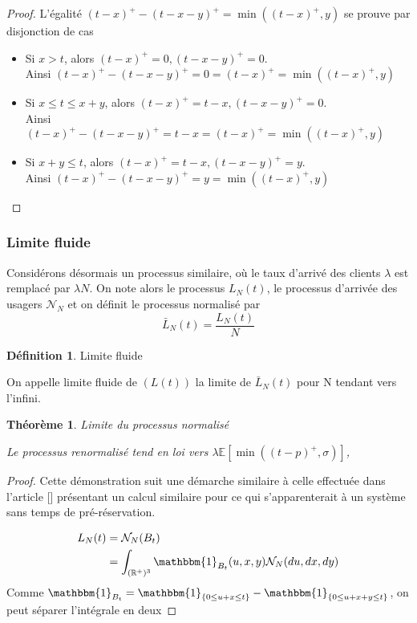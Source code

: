 \documentclass[12pt,a4paper]{article}
\newcommand{\E}[1]{\mathbb{E}\left[ #1 \right]}
\newcommand{\R}{\mathbb{R}}
\newcommand{\1}[1]{\mathbbm{1}_{\{#1\}} }
\newtheorem{theorem}{Théorème}
\theoremstyle{definition}
\newtheorem{definition}{Définition}
\begin{document}
{\begin{proof}
L'égalité $(t-x)^+-(t-x-y)^+ =  \min((t-x)^+,y)$ se prouve par disjonction de cas
\begin{itemize}
\item Si $x>t$, alors $(t-x)^+= 0, (t-x-y)^+ = 0$.\\
Ainsi $(t-x)^+-(t-x-y)^+ = 0 = (t-x)^+ = \min((t-x)^+,y)$

\item Si $x\leq t \leq x+y$, alors  $(t-x)^+= t-x, (t-x-y)^+ = 0$.\\
Ainsi $(t-x)^+-(t-x-y)^+ = t-x = (t-x)^+ = \min((t-x)^+,y)$

\item Si $x+y \leq t$, alors  $(t-x)^+= t-x, (t-x-y)^+ = y$.\\
Ainsi $(t-x)^+-(t-x-y)^+ = y = \min((t-x)^+,y)$ 
\end{itemize}
\end{proof}

\subsubsection{Limite fluide}
Considérons désormais un processus similaire, où le taux d'arrivé des clients $\lambda$ est remplacé par $\lambda N$. On note alors le processus $L_N(t)$, le processus d'arrivée des usagers $\mathcal{N}_N$ et on définit le processus normalisé par 
$$ \bar{L}_N(t) = \frac{L_N(t)}{N}$$


\begin{definition}{Limite fluide}

On appelle limite fluide de $(L(t)) $ la limite de $\bar{L}_N(t)$ pour N tendant vers l'infini.
\end{definition}

\begin{theorem}{Limite du processus normalisé}

Le processus renormalisé tend en loi vers $\lambda\E{\min((t-p)^+,\sigma)}$, 

\end{theorem}

\begin{proof}

Cette démonstration suit une démarche similaire à  celle effectuée dans l'article [] présentant un calcul similaire pour ce qui s'apparenterait à un système sans temps de pré-réservation.


\begin{align*}
L_N(t) &=  \mathcal{N}_N(B_t)\\
&= \int_{(\R^+)^3} \mathbbm{1}_{B_t}(u,x,y) \mathcal{N}_N(du,dx,dy)
\end{align*}
Comme $\mathbbm{1}_{B_t} = \1{0\leq u+x \leq t} - \1{0\leq u+x+y \leq t}$, on peut séparer l'intégrale en deux



\end{proof}}
\end{document}
